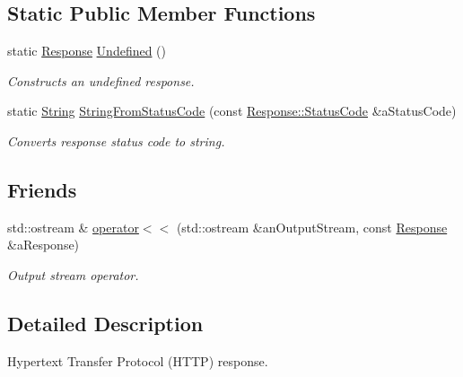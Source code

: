 \subsection*{Static Public Member Functions}
\begin{DoxyCompactItemize}
\item 
static \hyperlink{classlibrary_1_1io_1_1ip_1_1tcp_1_1http_1_1_response}{Response} \hyperlink{classlibrary_1_1io_1_1ip_1_1tcp_1_1http_1_1_response_a94f21d4e9187e055d8b3b21a96669626}{Undefined} ()
\begin{DoxyCompactList}\small\item\em Constructs an undefined response. \end{DoxyCompactList}\item 
static \hyperlink{namespacelibrary_1_1io_1_1ip_1_1tcp_1_1http_a1c435ea1e3614d52139da88a36632815}{String} \hyperlink{classlibrary_1_1io_1_1ip_1_1tcp_1_1http_1_1_response_a8255fec1c3b634266a963976dd931fca}{String\+From\+Status\+Code} (const \hyperlink{classlibrary_1_1io_1_1ip_1_1tcp_1_1http_1_1_response_aa6406ad2157079c939b37c94806069f0}{Response\+::\+Status\+Code} \&a\+Status\+Code)
\begin{DoxyCompactList}\small\item\em Converts response status code to string. \end{DoxyCompactList}\end{DoxyCompactItemize}
\subsection*{Friends}
\begin{DoxyCompactItemize}
\item 
std\+::ostream \& \hyperlink{classlibrary_1_1io_1_1ip_1_1tcp_1_1http_1_1_response_ae3715558aef62c5b9c3c9971e307dd8e}{operator$<$$<$} (std\+::ostream \&an\+Output\+Stream, const \hyperlink{classlibrary_1_1io_1_1ip_1_1tcp_1_1http_1_1_response}{Response} \&a\+Response)
\begin{DoxyCompactList}\small\item\em Output stream operator. \end{DoxyCompactList}\end{DoxyCompactItemize}


\subsection{Detailed Description}
Hypertext Transfer Protocol (H\+T\+TP) response. 

